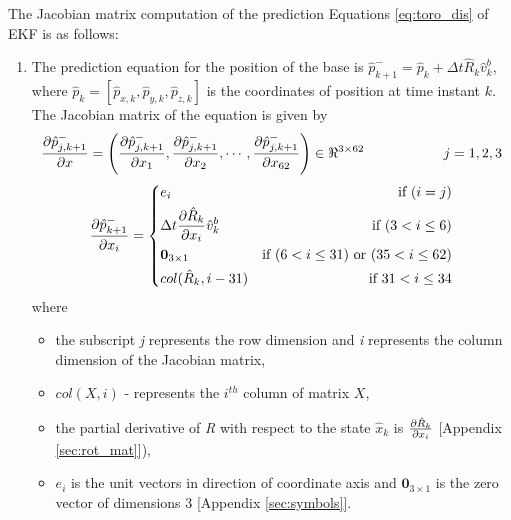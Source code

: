 The Jacobian matrix computation of the prediction Equations \ref{eq:toro_dis} of EKF is as follows:
\begin{enumerate}
\item The prediction equation for the position of the base is $ \hat{p}_{k+1}^- = \hat{p}_k + \Delta t \hat R_k \hat v^b_k$, where  $ \hat{p}_k = [\hat{p}_{x,k},\hat{p}_{y,k},\hat{p}_{z,k}]$ is the coordinates of position at time instant $k$. The Jacobian matrix of the equation is given by
\begin{equation}
\label{eq:dpdx}
\frac{\partial {\hat{p}_{j,k+1}^-}}{\partial {x}} = \left(\frac{\partial {\hat{p}_{j,k+1}^-}}{\partial {x_{1}}}, \frac{\partial {\hat{p}_{j,k+1}^-}}{\partial {x_{2}}}, \cdots , \frac{\partial {\hat{p}_{j,k+1}^-}}{\partial {x_{62}}}\right) \in \Re^{3 \times 62} \hspace{2cm} j=1,2,3
\end{equation}
\[
 \frac{\partial {\hat{p}_{k+1}^-}}{\partial {x_{i}}} =  \left\lbrace
  \!\begin{aligned}
   &e_i & \text{if }(i=j)\\
   &\Delta t \frac{\partial {\hat R_k}}{\partial {x_i}} \hat v^b_k & \text{if }(3 < i \leq 6)\\
   &\textbf{0}_{3 \times 1} &\text{if }(6 < i \leq 31) \text{ or } (35 < i \leq 62) \\
   &col(\hat R_k,i-31) & \text{if } 31 < i \leq 34 \\
  \end{aligned} \right.
\]where
\begin{itemize}
\item the subscript \emph{j} represents the row dimension and \emph{i} represents the column dimension of the Jacobian matrix,
\item $col(X,i)$ - represents the $i^{th}$ column of matrix $X$,
\item the partial derivative of \emph{R} with respect to the state $\hat{x}_k$ is $\frac{\partial {\hat R_k}}{\partial {x_i}}$ [Appendix \ref{sec:rot_mat}]),
\item  $e_i$ is the unit vectors in direction of coordinate axis and  $\textbf{0}_{3 \times 1}$ is the zero vector of dimensions 3 [Appendix \ref{sec:symbols}].
\end{itemize}


\end{enumerate}
